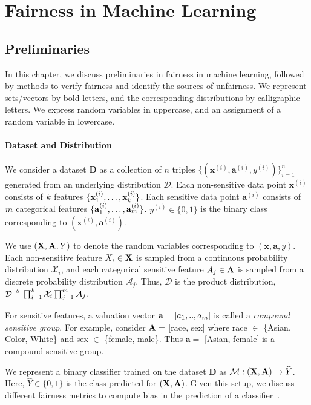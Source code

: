 \part{Fairness in Machine Learning}
\chapter{Preliminaries}
In this chapter, we discuss preliminaries in fairness in machine learning, followed by methods to verify fairness and identify the sources of unfairness. We represent sets/vectors by bold letters, and the corresponding distributions by calligraphic letters. We express random variables in uppercase, and an assignment of a random variable in lowercase.

\subsection*{Dataset and Distribution}
We consider a dataset $ \mathbf{D} $ as a collection of $n$ triples  $\{(\mathbf{x}^{(i)}, \mathbf{a}^{(i)}, y^{(i)})\}_{i=1}^n$ generated from an underlying distribution $\mathcal{D}$. Each non-sensitive data point $\mathbf{x}^{(i)}$ consists of $k$ features $\{\mathbf{x}^{(i)}_1, \dots, \mathbf{x}^{(i)}_{k}\} $. Each sensitive data point $\mathbf{a}^{(i)}$ consists of $m$ categorical features $\{\mathbf{a}^{(i)}_1, \dots, \mathbf{a}^{(i)}_{m}\} $.  $y^{(i)} \in \{0,1\}$ is the binary class corresponding to $(\mathbf{x}^{(i)}, \mathbf{a}^{(i)})$. 

We use $ (\mathbf{X}, \mathbf{A}, Y) $ to denote the random variables corresponding to $ (\mathbf{x}, \mathbf{a}, y)$.  Each non-sensitive feature $ X_i \in \mathbf{X} $ is sampled from a continuous probability distribution {$ \mathcal{X}_i $}, and each categorical sensitive feature $ A_j \in \mathbf{A} $ is sampled from a discrete probability distribution {$ \mathcal{A}_j $}. Thus, $ \mathcal{D} $ is the product distribution, $ \mathcal{D} \triangleq \prod_{i=1}^{k}\mathcal{X}_i \prod_{j=1}^{m} \mathcal{A}_j $.

For sensitive features, a valuation vector $ \mathbf{a} = [a_1, .., a_{m}] $ is called a \textit{compound sensitive group}. For example, consider $ \mathbf{A} = $ [race, sex] where race $ \in $ \{Asian, Color, White\} and sex $ \in $ \{female, male\}. Thus $ \mathbf{a} = $ [Asian, female]  is a compound sensitive group.


We represent a binary classifier trained on the dataset $\mathbf{D}$ as $\mathcal{M}: (\mathbf{X}, \mathbf{A}) \rightarrow \widehat{Y} $. Here, $\widehat{Y} \in \{0,1\}$ is the class predicted for $ (\mathbf{X}, \mathbf{A}) $. Given this setup, we discuss different fairness metrics to compute bias in the prediction of a classifier~\cite{feldman2015certifying,hardt2016equality,nabi2018fair}.



